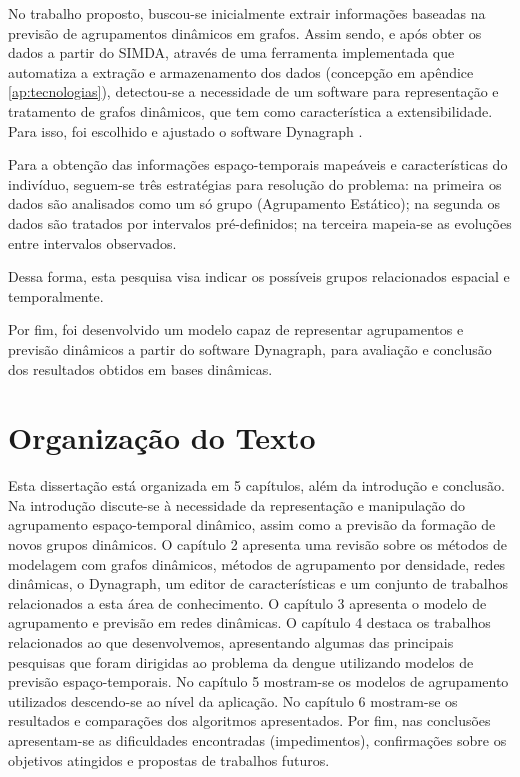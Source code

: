 No trabalho proposto, buscou-se inicialmente extrair informações baseadas na previsão de agrupamentos dinâmicos em grafos. Assim sendo, e após obter os dados a partir do \acrshort{SIMDA}, através de uma ferramenta implementada que automatiza a extração e armazenamento dos dados (concepção em apêndice \ref{ap:tecnologias}), detectou-se a necessidade de um software para representação e tratamento de grafos dinâmicos, que tem como característica a extensibilidade. Para isso, foi escolhido e ajustado o software Dynagraph \cite{dynagraph}.

Para a obtenção das informações espaço-temporais mapeáveis e características do indivíduo, seguem-se três estratégias para resolução do problema: na primeira os dados são analisados como um só grupo (Agrupamento Estático); na segunda os dados são tratados por intervalos pré-definidos; na terceira mapeia-se as evoluções entre intervalos observados.

Dessa forma, esta pesquisa visa indicar os possíveis grupos relacionados espacial e temporalmente.

Por fim, foi desenvolvido um modelo capaz de representar agrupamentos e previsão dinâmicos a partir do software Dynagraph, para avaliação e conclusão dos resultados obtidos em bases dinâmicas.

\section{Organização do Texto}
Esta dissertação está organizada em 5 capítulos, além da introdução e conclusão. Na
introdução discute-se à necessidade da representação e manipulação do agrupamento espaço-temporal dinâmico, assim como a previsão da formação de novos grupos dinâmicos. O capítulo 2 apresenta uma revisão sobre os métodos de modelagem com grafos dinâmicos, métodos de agrupamento por densidade, redes dinâmicas, o Dynagraph, um editor de características e um conjunto de trabalhos relacionados a esta área de conhecimento. O capítulo 3 apresenta o modelo de agrupamento e previsão em redes dinâmicas. O capítulo 4 destaca os trabalhos relacionados ao que desenvolvemos, apresentando algumas das principais pesquisas que foram dirigidas ao problema da dengue utilizando modelos de previsão espaço-temporais. No capítulo 5 mostram-se os modelos de agrupamento utilizados descendo-se ao nível da aplicação. No capítulo 6 mostram-se os resultados e comparações dos algoritmos apresentados. Por fim, nas conclusões apresentam-se as dificuldades encontradas (impedimentos), confirmações sobre os objetivos atingidos e propostas de trabalhos futuros.








